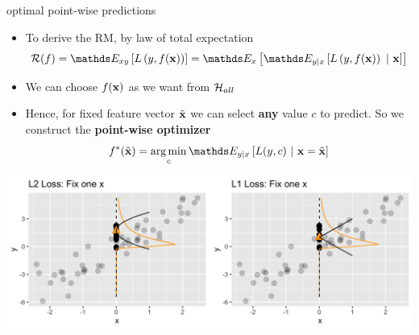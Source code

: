 \documentclass[11pt,compress,t,notes=noshow, xcolor=table]{beamer}
\begin{document}



\begin{frame}[t]{optimal point-wise predictions}  

\begin{itemize}

\item To derive the RM, by law of total expectation 
$$    \riskf = \E_{xy} \left[\Lxy\right] 
    = \E_x \left[\E_{y|x}\left[\Lxy~|~\xv\right]\right]$$

	\item We can choose $f(\mathbf{x})$ as we want from $\mathcal{H}_{all}$ %
	\item Hence, for fixed feature vector $\tilde{\mathbf{x}}$ we can select \textbf{any} value $c$ to predict. So we construct the \textbf{point-wise optimizer} 
 $$\fbayes(\xtil) = \argmin_c \E_{y|x}\left[L(y, c)~|~ \xv = \xtil \right] $$
\end{itemize}

\begin{center}
\includegraphics[width=1\textwidth]{figure/optimal_pointwise.png}
\end{center}


\end{frame}
\end{document}
